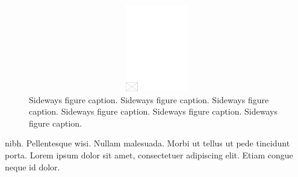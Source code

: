 \documentclass[APA,LATO1COL]{WileyNJD-v2}
\begin{document}
\begin{figure}
\centerline{\includegraphics[width=542pt,height=9pc,draft]{empty}}
\caption{Sideways figure caption. Sideways figure caption. Sideways figure caption. Sideways figure caption. Sideways figure caption. Sideways figure caption.\label{fig3}}
\end{figure}

nibh. Pellentesque wisi. Nullam malesuada. Morbi ut tellus ut pede tincidunt porta. Lorem ipsum dolor sit amet,
consectetuer adipiscing elit. Etiam congue neque id dolor.
\end{document}
